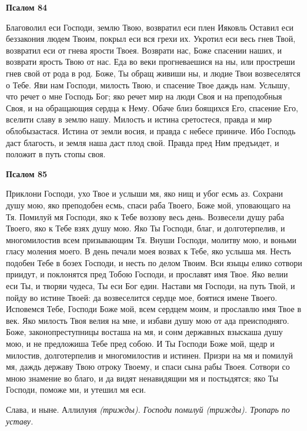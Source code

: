 \bfseries Псалом 84\normalfont{}


Благоволил еси Господи, землю Твою, возвратил еси плен Ияковль Оставил еси беззакония людем Твоим, покрыл еси вся грехи их. Укротил еси весь гнев Твой, возвратил еси от гнева ярости Твоея. Возврати нас, Боже спасении наших, и возврати ярость Твою от нас. Еда во веки прогневаешися на ны, или простреши гнев свой от рода в род. Боже, Ты обращ живиши ны, и людие Твои возвеселятся о Тебе. Яви нам Господи, милость Твою, и спасение Твое даждь нам. Услышу, что речет о мне Господь Бог; яко речет мир на люди Своя и на преподобныя Своя, и на обращающия сердца к Нему. Обаче близ боящихся Его, спасение Его, вселити славу в землю нашу. Милость и истина сретостеся, правда и мир облобызастася. Истина от земли восия, и правда с небесе приниче. Ибо Господь даст благость, и земля наша даст плод свой. Правда пред Ним предъидет, и положит в путь стопы своя.





\bfseries Псалом 85\normalfont{}


Приклони Господи, ухо Твое и услыши мя, яко нищ и убог есмь аз. Сохрани душу мою, яко преподобен есмь, спаси раба Твоего, Боже мой, уповающаго на Тя. Помилуй мя Господи, яко к Тебе воззову весь день. Возвесели душу раба Твоего, яко к Тебе взях душу мою. Яко Ты Господи, благ, и долготерпелив, и многомилостив всем призывающим Тя. Внуши Господи, молитву мою, и воньми гласу моления моего. В день печали моея возвах к Тебе, яко услыша мя. Несть подобен Тебе в бозех Господи, и несть по делом Твоим. Вси языцы елико сотвори приидут, и поклонятся пред Тобою Господи, и прославят имя Твое. Яко велии еси Ты, и творяи чудеса, Ты еси Бог един. Настави мя Господи, на путь Твой, и пойду во истине Твоей: да возвеселится сердце мое, боятися имене Твоего. Исповемся Тебе, Господи Боже мой, всем сердцем моим, и прославлю имя Твое в век. Яко милость Твоя велия на мне, и избави душу мою от ада преисподняго. Боже, законопреступницы восташа на мя, и сонм державных взыскаша душу мою, и не предложиша Тебе пред собою. И Ты Господи Боже мой, щедр и милостив, долготерпелив и многомилостив и истинен. Призри на мя и помилуй мя, даждь державу Твою отроку Твоему, и спаси сына рабы Твоея. Сотвори со мною знамение во благо, и да видят ненавидящии мя и постыдятся; яко Ты Господи, поможе ми, и утешил мя еси.


Слава, и ныне. Аллилуия \itshape (трижды)\normalfont{}. Господи помилуй \itshape (трижды)\normalfont{}. Тропарь по уставу.


